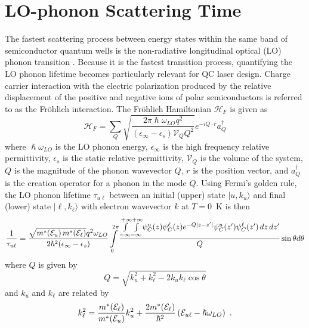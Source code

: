\documentclass[12pt]{report}
\begin{document}
{\section{LO-phonon Scattering Time}
The fastest scattering process between energy states within the same band of semiconductor quantum wells is the non-radiative longitudinal optical (LO) phonon transition \cite{Ferreira:PRB:1989}.  Because it is the fastest transition process, quantifying the LO phonon lifetime becomes particularly relevant for QC laser design.  Charge carrier interaction with the electric polarization produced by the relative displacement of the positive and negative ions of polar semiconductors is referred to as the Fr\"{o}hlich interaction.  The Fr\"{o}hlich Hamiltonian $\mathscr{H}_F$ is given as
\begin{equation}
\mathscr{H}_F = \sum_{{Q}} \sqrt{\frac{2 \pi \hslash\omega_{LO} q^2}{(\epsilon_\infty - \epsilon_s) \mathcal{V}_Q Q^2}} e^{-i {Q}\cdot{r}} a_{Q}^\dag
\end{equation}
where $\hslash\omega_{{LO}}$ is the LO phonon energy, $\epsilon_\infty$ is the high frequency relative permittivity, $\epsilon_s$ is the static relative permittivity, $\mathcal{V}_Q$ is the volume of the system, $Q$ is the magnitude of the phonon wavevector ${Q}$, ${r}$ is the position vector, and $a_{Q}^\dag$ is the creation operator for a phonon in the mode ${Q}$.  Using Fermi's golden rule, the LO phonon lifetime $\tau_{u\ell}$ between an initial (upper) state $|u,{k}_u\rangle$ and final (lower) state $|\ell,{k}_\ell\rangle$ with electron wavevector ${k}$ at $T=0$~K is then
\begin{equation}
\label{chpt1eqn:tau_complicated}
\frac{1}{\tau_{u\ell}} = \frac{\sqrt{m^*\!\left(\EE_u\right) m^*\!\left(\EE_\ell\right)} q^2 \omega_{{LO}}}{2 \hslash^2 (\epsilon_\infty - \epsilon_s)} \int\limits_0^{2 \pi} \frac{\int\limits_{-\infty}^{+\infty} \! \int\limits_{-\infty}^{+\infty} \! \psi_C^u(z) \psi_C^\ell (z) e^{-Q|z-z'|} \psi_C^u(z') \psi_C^\ell (z') \, dz \, dz'}{Q} \sin\theta d\theta
\end{equation}
where $Q$ is given by
\begin{equation}
Q=\sqrt{k_u^2+k_\ell^2-2 k_u k_\ell \cos\theta}
\end{equation}
and $k_u$ and $k_\ell$ are related by
\begin{equation}
k_\ell^2 = \frac{m^*\!\left(\EE_\ell\right)}{m^*\!\left(\EE_u\right)} k_u^2 + \frac{2 m^*\!\left(\EE_\ell\right)}{\hslash^2} \left(\EE_{u\ell}-\hslash\omega_{{LO}}\right) {~.}
\end{equation}
}
\end{document}
